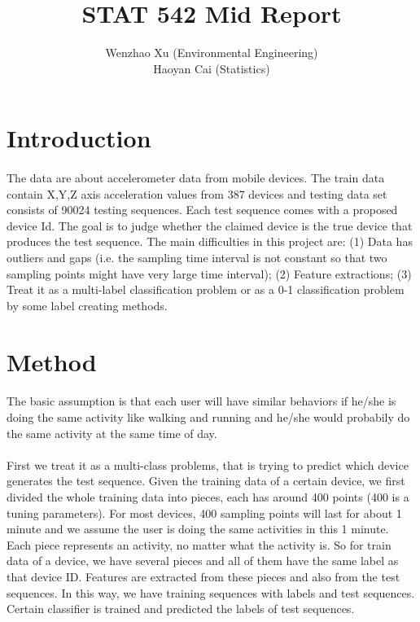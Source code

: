 \documentclass{article}
\author{Wenzhao Xu (Environmental Engineering)\\ Haoyan Cai (Statistics)}
\title{STAT 542 Mid Report}
\begin{document}
	\maketitle
	
	\section{Introduction} %
	\label{sec:introduction}
	\paragraph{} The data are about accelerometer data from mobile devices. The train data contain X,Y,Z axis acceleration values from 387 devices and testing data set consists of 90024 testing sequences. Each test sequence comes with a proposed device Id. The goal is to judge whether the claimed device is the true device that produces the test sequence. The main difficulties in this project are: (1) Data has outliers and gaps (i.e. the sampling time interval is not constant so that two sampling points might have very large time interval); (2) Feature extractions; (3) Treat it as a multi-label classification problem or as a 0-1 classification problem by some label creating methods. 
	
	
	\section{Method} %
	\label{sec:method}
	\paragraph{} The basic assumption is that each user will have similar behaviors if he/she is doing the same activity like walking and running and he/she would probabily do the same activity at the same time of day. 
	\paragraph{}First we treat it as a multi-class problems, that is trying to predict which device generates the test sequence. Given the training data of a certain device, we first divided the whole training data into pieces, each has around 400 points (400 is a tuning parameters). For most devices, 400 sampling points will last for about 1 minute and we assume the user is doing the same activities in this 1 minute. Each piece represents an activity, no matter what the activity is. So for train data of a device, we have several pieces and all of them have the same label as that device ID. Features are extracted from these pieces and also from the test sequences. In this way, we have training sequences with labels and test sequences. Certain classifier is trained and predicted the labels of test sequences.
\end{document}
